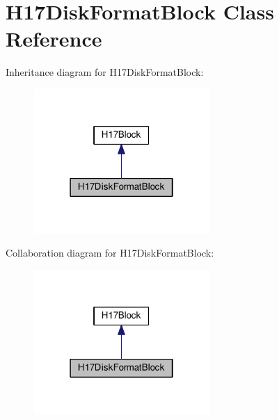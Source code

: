 \hypertarget{classH17DiskFormatBlock}{}\section{H17\+Disk\+Format\+Block Class Reference}
\label{classH17DiskFormatBlock}


Inheritance diagram for H17\+Disk\+Format\+Block\+:\nopagebreak
\begin{figure}[H]
\begin{center}
\leavevmode
\includegraphics[width=190pt]{classH17DiskFormatBlock__inherit__graph}
\end{center}
\end{figure}


Collaboration diagram for H17\+Disk\+Format\+Block\+:\nopagebreak
\begin{figure}[H]
\begin{center}
\leavevmode
\includegraphics[width=190pt]{classH17DiskFormatBlock__coll__graph}
\end{center}
\end{figure}
